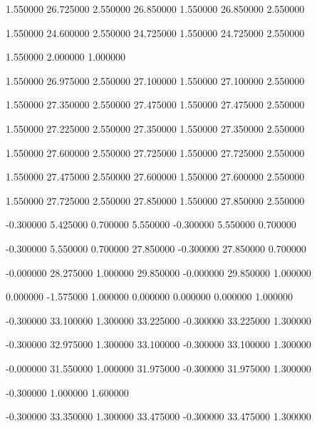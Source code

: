  {1.550000} {26.725000} {2.550000} {26.850000} {1.550000} {26.850000} {2.550000}

 {1.550000} {24.600000} {2.550000} {24.725000} {1.550000} {24.725000} {2.550000}

 {1.550000} {2.000000} {1.000000}

 {1.550000} {26.975000} {2.550000} {27.100000} {1.550000} {27.100000} {2.550000}

 {1.550000} {27.350000} {2.550000} {27.475000} {1.550000} {27.475000} {2.550000}

 {1.550000} {27.225000} {2.550000} {27.350000} {1.550000} {27.350000} {2.550000}

 {1.550000} {27.600000} {2.550000} {27.725000} {1.550000} {27.725000} {2.550000}

 {1.550000} {27.475000} {2.550000} {27.600000} {1.550000} {27.600000} {2.550000}

 {1.550000} {27.725000} {2.550000} {27.850000} {1.550000} {27.850000} {2.550000}

 {-0.300000} {5.425000} {0.700000} {5.550000} {-0.300000} {5.550000} {0.700000}

 {-0.300000} {5.550000} {0.700000} {27.850000} {-0.300000} {27.850000} {0.700000}

 {-0.000000} {28.275000} {1.000000} {29.850000} {-0.000000} {29.850000} {1.000000}

 {0.000000} {-1.575000} {1.000000} {0.000000} {0.000000} {0.000000} {1.000000}

 {-0.300000} {33.100000} {1.300000} {33.225000} {-0.300000} {33.225000} {1.300000}

 {-0.300000} {32.975000} {1.300000} {33.100000} {-0.300000} {33.100000} {1.300000}

 {-0.000000} {31.550000} {1.000000} {31.975000} {-0.300000} {31.975000} {1.300000}

 {-0.300000} {1.000000} {1.600000}

 {-0.300000} {33.350000} {1.300000} {33.475000} {-0.300000} {33.475000} {1.300000}

